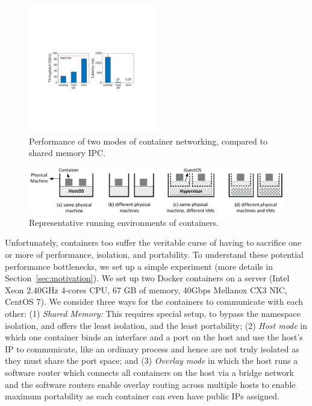 \begin{figure}[th]
     \centering 
     \includegraphics[width=0.5\textwidth]{figures/intro/intro_exist2.pdf} 
     \caption{Performance of two modes of container networking, compared to
     shared memory IPC.} 
     \label{fig:three_modes} 
\end{figure} 
\begin{figure} [t]
	\centering   
	\includegraphics[width=6.7in]{figures/deployment-cases.pdf}   
	\caption{\label{fig:deploy-cases} Representative running environments of containers.}   
\end{figure}

Unfortunately, containers too suffer the veritable curse of having to sacrifice
one or more of performance, isolation, and portability.  To understand these
potential performance bottlenecks, we set up a simple experiment (more details
in Section~\ref{sec:motivation}).  We set up two Docker containers on a server
(Intel Xeon 2.40GHz 4-cores CPU, 67 GB of memory, 40Gbps Mellanox CX3 NIC,
CentOS 7). We consider three ways for the containers to communicate with each
other: (1) {\em Shared Memory:} This requires special setup, to bypass the
namespace isolation, and offers the least isolation, and the least portability;
(2) {\em Host  mode} in which one container binds an interface and a port on the
host and use the host's IP to communicate, like an ordinary process and hence
are not truly isolated as they must share the port space; and (3)  {\em Overlay
mode} in which the host runs a software router which connects all containers on
the host via  a bridge network and the software routers enable overlay routing
across multiple hosts to enable maximum portability as  each container can even
have public IPs assigned.

